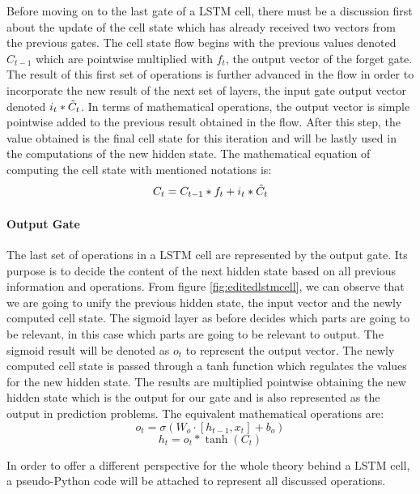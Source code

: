 \vspace{5mm}

Before moving on to the last gate of a LSTM cell, there must be a discussion first about the update of the cell state which has already received two vectors from the previous gates. The cell state flow begins with the previous values denoted $\displaystyle C_{t-1}$ which are pointwise multiplied with $\displaystyle f_t$, the output vector of the forget gate. The result of this first set of operations is further advanced in the flow in order to incorporate the new result of the next set of layers, the input gate output vector denoted $\displaystyle i_t * \Tilde{C}_t$. In terms of mathematical operations, the output vector is simple pointwise added to the previous result obtained in the flow. After this step, the value obtained is the final cell state for this iteration and will be lastly used in the computations of the new hidden state. The mathematical equation of computing the cell state with mentioned notations is:
\[ C_t = C_{t-1} * f_t + i_t * \Tilde{C}_t\]

\paragraph{Output Gate}\mbox{} 

\vspace{5mm}

The last set of operations in a LSTM cell are represented by the output gate. Its purpose is to decide the content of the next hidden state based on all previous information and operations. From figure \ref{fig:editedlstmcell}, we can observe that we are going to unify the previous hidden state, the input vector and the newly computed cell state. The sigmoid layer as before decides which parts are going to be relevant, in this case which parts are going to be relevant to output. The sigmoid result will be denoted as $\displaystyle o_t$ to represent the output vector. The newly computed cell state is passed through a tanh function which regulates the values for the new hidden state. The results are multiplied pointwise obtaining the new hidden state which is the output for our gate and is also represented as the output in prediction problems. The equivalent mathematical operations are:
\[ o_t = \sigma(W_o\cdot[h_{t-1},x_t]+b_o)\]
\[ h_t = o_t * \tanh(C_t) \]

In order to offer a different perspective for the whole theory behind a LSTM cell, a pseudo-Python code will be attached to represent all discussed operations.

